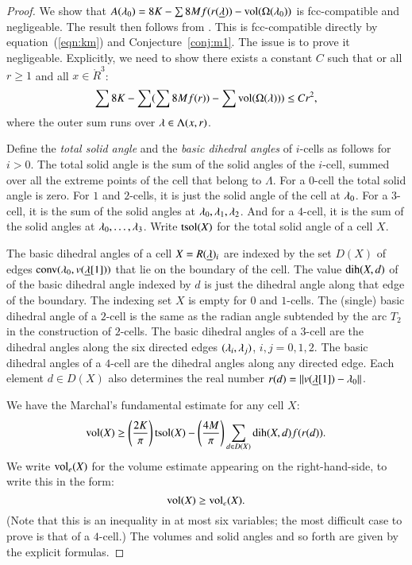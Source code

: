 \begin{proof} 
We show that $A(\lambda_0)  = 8 K - \sum 8 M f(r({\underline{\lambda}})) -{\operatorname{vol}}(\Omega(\lambda_0))$ is fcc-compatible and negligeable.  The
result then follows from \cite[Lemma~3.3]{DCG}.  This is fcc-compatible directly
by equation~(\ref{eqn:km})
and Conjecture~\ref{conj:m1}.  The issue is to prove it negligeable.  Explicitly, we need
to show there exists a constant  $C$ such that or all $r\ge 1$ and all $x\in\ring{R}^3$:
\begin{equation}\label{eqn:neg}
\sum 8K - \sum (\sum 8 M f(r)) - \sum {\operatorname{vol}}(\Omega(\lambda))) \le C r^2,
\end{equation}
where the outer sum runs over $\lambda\in \Lambda(x,r)$.


Define the {\it total solid angle} and the {\it basic dihedral angles} of $i$-cells as follows for
$i>0$.  The total solid angle is the sum of the solid angles of the $i$-cell, summed
over all the extreme points of the cell that belong to $\Lambda$.  For a $0$-cell
the total solid angle is zero. For $1$ and $2$-cells,
it is just the solid angle of the cell at $\lambda_0$.  For a $3$-cell, it is the sum of the
solid angles at $\lambda_0,\lambda_1,\lambda_2$.  And for a $4$-cell, it is the sum of the solid
angles at $\lambda_0,\ldots,\lambda_3$. Write ${\operatorname{tsol}}(X)$ for the total solid angle of a cell $X$.


The  basic dihedral angles of a cell $X = R({\underline{\lambda}})_i$ are indexed by the set $D(X)$ of
edges ${\operatorname{conv}}(\lambda_0,v({\underline{\lambda}}[1]))$ that lie on the boundary of the cell.  The value
$\operatorname{dih}(X,d)$ of
of the basic dihedral angle indexed by $d$ is just the dihedral angle along that edge
of the boundary.  The indexing set $X$ is empty for  $0$ and $1$-cells.
The (single) basic  dihedral angle of a $2$-cell is
the same as the radian angle subtended by the arc $T_2$ in the construction of $2$-cells.
The basic dihedral angles of a $3$-cell are the dihedral angles along the
six directed edges $(\lambda_i,\lambda_j)$, $i,j=0,1,2$.  The basic dihedral angles of a $4$-cell are
the dihedral angles along any directed edge.  Each element $d\in D(X)$ also determines
the real number $r(d) = {\|v({\underline{\lambda}}[1])-\lambda_0\|}$.

We have the Marchal's fundamental estimate for any cell $X$:
\begin{equation}\label{eqn:mfe}
{\operatorname{vol}}(X) \ge \left(\frac{2K}{\pi}\right) {\operatorname{tsol}}(X) - \left(\frac{4M}{\pi}\right)
\sum_{d\in D(X)} \operatorname{dih}(X,d) f(r(d)).
\end{equation}
We write ${\operatorname{vol}}_e(X)$ for the volume estimate appearing on the 
right-hand-side, to write this in the form:
\begin{equation}\label{eqn:vole}
{\operatorname{vol}}(X) \ge {\operatorname{vol}}_e(X).
\end{equation}
(Note that this is an inequality in at most six variables; the most difficult case to prove
is that of a $4$-cell.)  The volumes and solid angles and so forth are given by the 
explicit formulas.


\end{proof}
